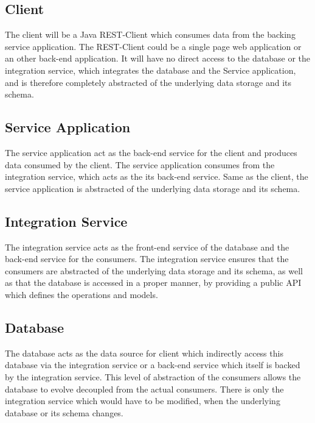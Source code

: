 \subsection{Client}
\label{sec:esboc-design-service-client}
The client will be a Java REST-Client which consumes data from the backing service application. The REST-Client could be a single page web application or an other back-end application. It will have no direct access to the database or the integration service, which integrates the database and the Service application, and is therefore completely abstracted of the underlying data storage and its schema.

\subsection{Service Application}
\label{sec:esboc-design-service-app}
The service application act as the back-end service for the client and produces data consumed by the client. The service application consumes from the integration service, which acts as the its back-end service. Same as the client, the service application is abstracted of the underlying data storage and its schema. 

\subsection{Integration Service}
\label{sec:esboc-design-service-integration}
The integration service acts as the front-end service of the database and the back-end service for the consumers. The integration service ensures that the consumers are abstracted of the underlying data storage and its schema, as well as that the database is accessed in a proper manner, by providing a public API which defines the operations and models.

\subsection{Database}
\label{sec:esboc-design-service-database}
The database acts as the data source for client which indirectly access this database via the integration service or a back-end service which itself is backed by the integration service. This level of abstraction of the consumers allows the database to evolve decoupled from the actual consumers. There is only the integration service which would have to be modified, when the underlying database or its schema changes.
\newpage

